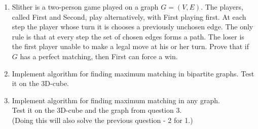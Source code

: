 \documentclass[11pt, oneside]{article}
\begin{document}
\begin{enumerate}
  \item %
    Slither is a two-person game played on a graph $G=(V,E)$. 
    The players, called First and Second, play alternatively, with First playing first.
    At each step the player whose turn it is chooses a previously unchosen edge.
    The only rule is that at every step the set of chosen edges forms a path.
    The loser is the first player unable to make a legal move at his or her turn.
    Prove that if $G$ has a perfect matching, then First can force a win.

  \item %
    Implement algorithm for finding maximum matching in bipartite graphs.
    Test it on the 3D-cube.

  \item %
    Implement algorithm for finding maximum matching in any graph.\\
    Test it on the 3D-cube and the graph from question 3.\\
    (Doing this will also solve the previous question - 2 for 1.)
\end{enumerate}
\end{document}
